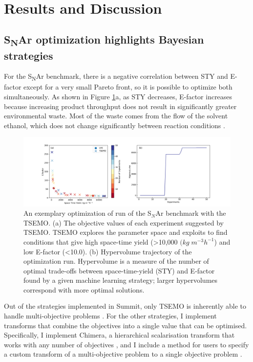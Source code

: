 \section{Results and Discussion}

\subsection{S\textsubscript{N}Ar optimization highlights Bayesian strategies}
For the S\textsubscript{N}Ar benchmark, there is a negative correlation between STY and E-factor except for a very small Pareto front, so it is possible to optimize both simultaneously. As shown in Figure \ref{fig:S$_N$Ar_tsemo}a, as STY decreases, E-factor increases because increasing product throughput does not result in significantly greater environmental waste. Most of the waste comes from the flow of the solvent ethanol, which does not change significantly between reaction conditions \cite{Jeraal2020}.

\begin{figure}
    \centering
    \includegraphics[width=\textwidth]{gfx/Chapter03/snar_tsemo_pareto_hv.png}
    \caption{An exemplary optimization of run of the S$_N$Ar benchmark with the TSEMO. (a) The objective values of each experiment suggested by TSEMO. TSEMO explores the parameter space and exploits to find conditions that give high space-time yield (>10,000 $(kg \; m^{-3} h^{-1}$) and low E-factor (<10.0). (b) Hypervolume trajectory of the optimization run. Hypervolume is a measure of the number of optimal trade-offs between space-time-yield (STY) and E-factor found by a given machine learning strategy; larger hypervolumes correspond with more optimal solutions.}
    \label{fig:S$_N$Ar_tsemo}
\end{figure}

Out of the strategies implemented in Summit, only TSEMO is inherently able to handle multi-objective problems \cite{Bradford2018}. For the other strategies, I implement transforms that combine the objectives into a single value that can be optimised. Specifically, I implement Chimera, a hierarchical scalarisation transform that works with any number of objectives \cite{Hase2018b}, and I include a method for users to specify a custom transform of a multi-objective problem to a single objective problem \cite{Fitzpatrick2016, Epps2020}.

